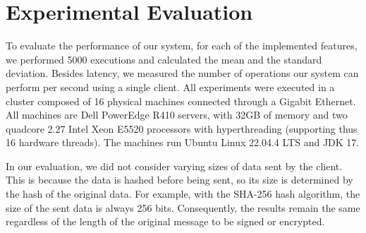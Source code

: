 \documentclass[runningheads]{llncs}
\begin{document}
\section{Experimental Evaluation} \label{sec:expevaluation}

To evaluate the performance of our system, for each of the implemented features, we performed 5000 executions and calculated the mean and the standard deviation. Besides latency, we measured the number of operations our system can perform per second using a single client. All experiments were executed in a cluster composed of 16 physical machines connected through a Gigabit Ethernet. All machines are Dell PowerEdge R410 servers, with 32GB of memory and two quadcore 2.27 Intel Xeon E5520 processors with hyperthreading (supporting thus 16 hardware threads). The machines run Ubuntu Linux 22.04.4 LTS and JDK 17.

In our evaluation, we did not consider varying sizes of data sent by the client. This is because the data is hashed before being sent, so its size is determined by the hash of the original data. For example, with the SHA-256 hash algorithm, the size of the sent data is always 256 bits. Consequently, the results remain the same regardless of the length of the original message to be signed or encrypted.
\end{document}
